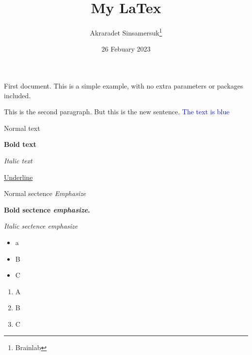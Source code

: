 \documentclass{article}
\title{My LaTex}
\author{Akraradet Sinsamersuk\thanks{Brainlab}}
\date{26 Febuary 2023}
\begin{document}
\maketitle

\newpage

First document.
This is a simple example,
with no extra parameters or packages included.


This is the second paragraph.
But this is the new sentence.
\textcolor{blue}{The text is blue}

\newpage

Normal text

\textbf{Bold text}

\textit{Italic text}

\underline{Underline}

Normal sectence \emph{Emphasize}

\textbf{Bold sectence \emph{emphasize}. }

\textit{Italic sectence \emph{emphasize}}

\begin{itemize}
    \item a
    \item B
    \item C
\end{itemize}

\begin{enumerate}
    \item A
    \item B
    \item C
\end{enumerate}
\end{document}

